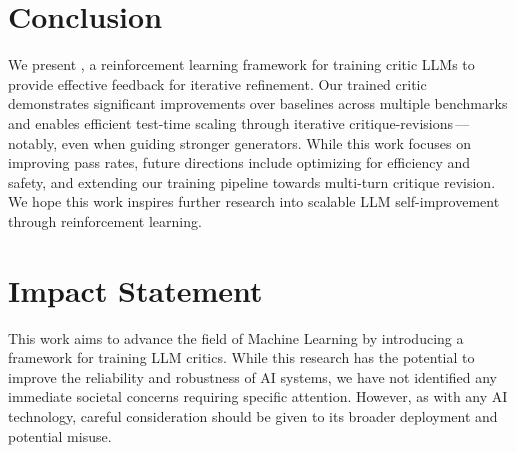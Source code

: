 \section{Conclusion}
We present {\ours}, a reinforcement learning framework for training critic LLMs to provide effective feedback for iterative refinement. Our trained critic demonstrates significant improvements over baselines across multiple benchmarks and enables efficient test-time scaling through iterative critique-revisions\,---\,notably, even when guiding stronger generators. While this work focuses on improving pass rates, future directions include optimizing for efficiency and safety, and extending our training pipeline towards multi-turn critique revision. We hope this work inspires further research into scalable LLM self-improvement through reinforcement learning.















\section*{Impact Statement}
This work aims to advance the field of Machine Learning by introducing a framework for training LLM critics. While this research has the potential to improve the reliability and robustness of AI systems, we have not identified any immediate societal concerns requiring specific attention. However, as with any AI technology, careful consideration should be given to its broader deployment and potential misuse.


